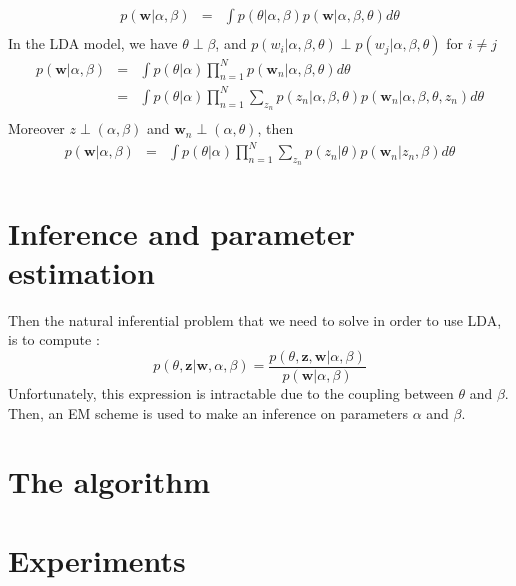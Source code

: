 \documentclass[12pt]{article}
\begin{document}
\begin{eqnarray*}
p(\textbf{w}|\alpha, \beta) &  = & \int p(\theta | \alpha, \beta)p(\textbf{w} | \alpha, \beta, \theta)d\theta\\
\end{eqnarray*}
In the LDA model, we have $ \theta \perp \beta$, and $p(w_{i} | \alpha, \beta, \theta) \perp p(w_{j} | \alpha, \beta, \theta)$  for $ i \neq j $
\begin{eqnarray*}
p(\textbf{w}|\alpha, \beta) & = & \int p(\theta | \alpha) \prod_{n=1}^{N} p(\textbf{w}_{n} | \alpha, \beta, \theta)d\theta\\
& = & \int  p(\theta |\alpha) \prod_{n=1}^{N}  \sum_{z_{n}}p(z_{n}|\alpha, \beta, \theta)p(\textbf{w}_{n} | \alpha, \beta, \theta, z_{n}) d\theta\\
\end{eqnarray*}
Moreover $z \perp (\alpha,\beta)$ and $\textbf{w}_{n} \perp (\alpha,\theta)$, then
\begin{eqnarray*}
p(\textbf{w}|\alpha, \beta) & = & \int p(\theta | \alpha)  \prod_{n=1}^{N}  \sum_{z_{n}}p(z_{n} |\theta)p(\textbf{w}_{n} | z_{n}, \beta) d\theta\\
\end{eqnarray*}

\section*{Inference and parameter estimation}
Then the natural inferential problem that we need to solve in order to use LDA, is to compute :
$$p(\theta, \textbf{z}|\textbf{w},\alpha,\beta)=\frac{p(\theta,\textbf{z},\textbf{w}|\alpha,\beta)}{p(\textbf{w}|\alpha,\beta)}$$
Unfortunately, this expression is intractable due to the coupling between $\theta$ and $\beta$.
Then, an EM scheme is used to make an inference on parameters $\alpha$ and $\beta$. ~\\

\section{The algorithm}

\section{Experiments}

\end{document}

